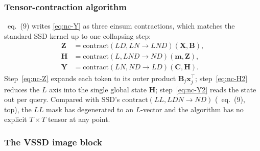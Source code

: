\documentclass[11pt,a4paper]{article}
\begin{document}
\subsubsection{Tensor-contraction algorithm}\label{sec:ncssd-tensor}

\cite{vssd}~eq.~(9) writes \eqref{eq:nc-Y} as three einsum
contractions, which matches the standard SSD kernel up to one
collapsing step:
\begin{align}
  \bm{Z} &= \mathrm{contract}(LD, LN \to LND)(\bm{X}, \bm{B}), \label{eq:nc-Z}\\
  \bm{H} &= \mathrm{contract}(L, LND \to ND)(\bm{m}, \bm{Z}), \label{eq:nc-H2}\\
  \bm{Y} &= \mathrm{contract}(LN, ND \to LD)(\bm{C}, \bm{H}). \label{eq:nc-Y2}
\end{align}
Step~\eqref{eq:nc-Z} expands each token to its outer product
$\bm{B}_j\bm{x}_j^\top$; step~\eqref{eq:nc-H2} reduces the $L$ axis
into the single global state $\bm{H}$; step~\eqref{eq:nc-Y2} reads
the state out per query. Compared with SSD's
$\mathrm{contract}(LL, LDN \to ND)$ (\cite{vssd}~eq.~(9), top), the
$LL$ mask has degenerated to an $L$-vector and the algorithm has no
explicit $T\times T$ tensor at any point.

\subsubsection{The VSSD image block}
\end{document}
